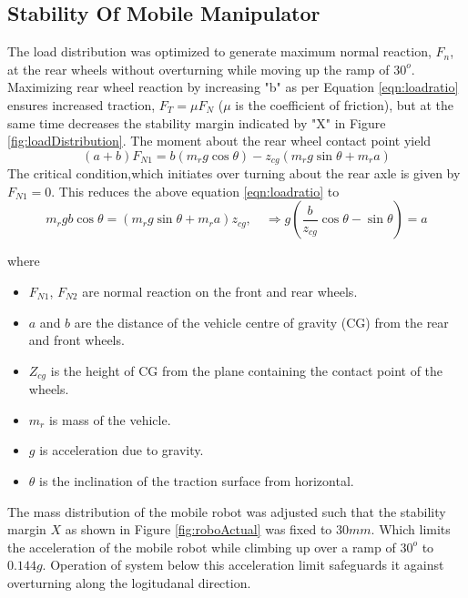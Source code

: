 \subsection{Stability Of Mobile Manipulator}
  The load distribution was optimized to generate maximum normal reaction, $F_n$,  at the rear wheels without overturning while moving up the ramp of $30^o$. Maximizing rear wheel reaction by increasing  "b" as per Equation \ref{eqn:loadratio} ensures increased traction, $F_T=\mu F_N$ ($\mu$ is the coefficient of friction), but at the same time decreases the stability margin indicated by "X" in Figure \ref{fig:loadDistribution}. The  moment about the rear wheel contact point yield
\begin{equation}
\label{eqn:loadratio}
(a+b)F_{N1}=b(m_r g\cos\theta)-z_{cg}(m_r g\sin\theta+m_r a)
\end{equation}
The critical condition,which  initiates over turning about the rear axle is given by $F_{N1} =0$.  This reduces the above equation \ref{eqn:loadratio} to 
\begin{equation}
\label{eqn:overturn}
m_rgb\cos\theta=(m_rg\sin\theta+m_ra)z_{cg}, \quad \Rightarrow g(\frac{b}{z_{cg}}\cos\theta-\sin\theta)=a
\end{equation}

 

where 
\begin{itemize}
\item[] $F_{N1}$, $F_{N2}$ are normal reaction on the front and rear wheels.
\item[] $a$ and $b$ are the distance of the vehicle centre of gravity (CG) from the rear and front wheels.
\item [] $Z_{cg}$ is the height of  CG from the  plane containing the contact point of the wheels.
\item [] $m_r$ is mass of the vehicle.
\item [] $g$ is acceleration due to gravity.
\item[] $\theta$ is the inclination of the traction surface from horizontal.
\end{itemize}
The mass distribution of the mobile robot was  adjusted such that the stability margin $X$ as shown in Figure \ref{fig:roboActual} was fixed to $30mm$. Which  limits  the acceleration of the mobile robot while climbing up  over a ramp of $30^o$ to $0.144g$. Operation of system below this acceleration limit safeguards it against overturning along the logitudanal direction. 

